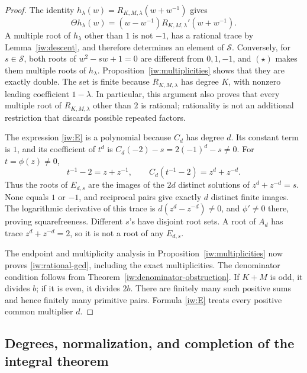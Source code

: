 \documentclass[11pt,a4paper]{article}
\theoremstyle{definition}
\theoremstyle{remark}
\begin{document}
\begin{proof}
The identity \(h_\lambda(w)=R_{K,M,\lambda}(w+w^{-1})\) gives
\[
 \Theta h_\lambda(w)
 =(w-w^{-1})R_{K,M,\lambda}'(w+w^{-1}).
 \tag{\(\star\)}
\]
A multiple root of \(h_\lambda\) other than \(1\) is not \(-1\),
has a rational trace by Lemma~\ref{iw:descent}, and therefore
determines an element of \(\mathcal S\). Conversely, for
\(s\in\mathcal S\), both roots of \(w^2-sw+1=0\) are different
from \(0,1,-1\), and \((\star)\) makes them multiple roots of
\(h_\lambda\). Proposition~\ref{iw:multiplicities} shows that
they are exactly double. The set is finite because
\(R_{K,M,\lambda}\) has degree \(K\), with nonzero leading
coefficient \(1-\lambda\). In particular, this argument also
proves that every multiple root of \(R_{K,M,\lambda}\) other
than \(2\) is rational; rationality is not an additional
restriction that discards possible repeated factors.

The expression \eqref{iw:E} is a polynomial because \(C_d\)
has degree \(d\). Its constant term is \(1\), and its coefficient
of \(t^d\) is \(C_d(-2)-s=2(-1)^d-s\ne0\).
For \(t=\phi(z)\ne0\),
\[
 t^{-1}-2=z+z^{-1},\qquad
 C_d(t^{-1}-2)=z^d+z^{-d}.
\]
Thus the roots of \(E_{d,s}\) are the images of the \(2d\)
distinct solutions of \(z^d+z^{-d}=s\). None equals \(1\) or
\(-1\), and reciprocal pairs give exactly \(d\) distinct
finite images. The logarithmic derivative of this trace is
\(d(z^d-z^{-d})\ne0\), and \(\phi'\ne0\) there, proving
squarefreeness. Different \(s\)'s have disjoint root sets.
A root of \(A_d\) has trace \(z^d+z^{-d}=2\), so it is not
a root of any \(E_{d,s}\).

The endpoint and multiplicity analysis in
Proposition~\ref{iw:multiplicities} now proves
\eqref{iw:rational-gcd}, including the exact multiplicities.
The denominator condition follows from
Theorem~\ref{iw:denominator-obstruction}. If \(K+M\) is odd,
it divides \(b\); if it is even, it divides \(2b\).
There are finitely many such positive sums and hence finitely
many primitive pairs. Formula \eqref{iw:E} treats every
positive common multiplier \(d\).
\end{proof}

\subsection{Degrees, normalization, and completion of the integral theorem}
\end{document}
